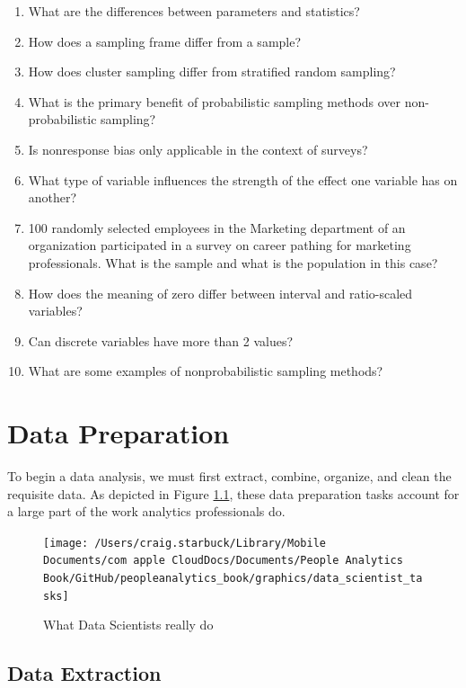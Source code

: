 \documentclass[
]{book}
\begin{document}
\begin{enumerate}
\def\labelenumi{\arabic{enumi}.}
\item
  What are the differences between parameters and statistics?
\item
  How does a sampling frame differ from a sample?
\item
  How does cluster sampling differ from stratified random sampling?
\item
  What is the primary benefit of probabilistic sampling methods over non-probabilistic sampling?
\item
  Is nonresponse bias only applicable in the context of surveys?
\item
  What type of variable influences the strength of the effect one variable has on another?
\item
  100 randomly selected employees in the Marketing department of an organization participated in a survey on career pathing for marketing professionals. What is the sample and what is the population in this case?
\item
  How does the meaning of zero differ between interval and ratio-scaled variables?
\item
  Can discrete variables have more than 2 values?
\item
  What are some examples of nonprobabilistic sampling methods?
\end{enumerate}

\hypertarget{data-prep}{%
\chapter{Data Preparation}\label{data-prep}}

To begin a data analysis, we must first extract, combine, organize, and clean the requisite data. As depicted in Figure \ref{fig:ds-tasks}, these data preparation tasks account for a large part of the work analytics professionals do.

\begin{figure}

{\centering \texttt{[image: /Users/craig.starbuck/Library/Mobile Documents/com~apple~CloudDocs/Documents/People Analytics Book/GitHub/peopleanalytics\_book/graphics/data\_scientist\_tasks]} 

}

\caption{What Data Scientists really do}\label{fig:ds-tasks}
\end{figure}

\hypertarget{data-extraction}{%
\section{Data Extraction}\label{data-extraction}}
\end{document}
